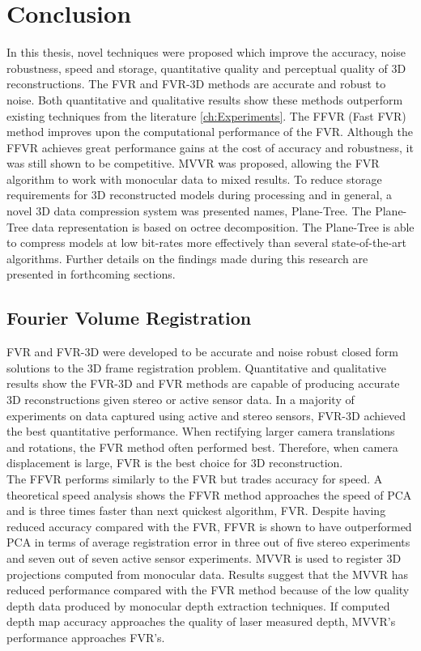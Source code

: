 \makeatletter
\chapter{Conclusion}
\label{ch:Conclusion}

In this thesis, novel techniques were proposed which improve the accuracy, noise robustness, speed and storage, quantitative quality and perceptual quality of 3D reconstructions. The FVR and FVR-3D methods are accurate and robust to noise. Both quantitative and qualitative results show these methods outperform existing techniques from the literature \ref{ch:Experiments}. The FFVR (Fast FVR) method improves upon the computational performance of the FVR. Although the FFVR achieves great performance gains at the cost of accuracy and robustness, it was still shown to be competitive. MVVR was proposed, allowing the FVR algorithm to work with monocular data to mixed results. To reduce storage requirements for 3D reconstructed models during processing and in general, a novel 3D data compression system was presented names, Plane-Tree. The Plane-Tree data representation is based on octree decomposition. The Plane-Tree is able to compress models at low bit-rates more effectively than several state-of-the-art algorithms. Further details on the findings made during this research are presented in forthcoming sections. \\

\section{Fourier Volume Registration}
\label{Sec:ConcFVR}

FVR and FVR-3D were developed to be accurate and noise robust closed form solutions to the 3D frame registration problem. Quantitative and qualitative results show the FVR-3D and FVR methods are capable of producing accurate 3D reconstructions given stereo or active sensor data. In a majority of experiments on data captured using active and stereo sensors, FVR-3D achieved the best quantitative performance.  When rectifying larger camera translations and rotations, the FVR method often performed best. Therefore, when camera displacement is large, FVR is the best choice for 3D reconstruction. \\

The FFVR performs similarly to the FVR but trades accuracy for speed. A theoretical speed analysis shows the FFVR method approaches the speed of PCA and is three times faster than next quickest algorithm, FVR. Despite having reduced accuracy compared with the FVR, FFVR is shown to have outperformed PCA in terms of average registration error in three out of five stereo experiments and seven out of seven active sensor experiments. MVVR is used to register 3D projections computed from monocular data. Results suggest that the MVVR has reduced performance compared with the FVR method because of the low quality depth data produced by monocular depth extraction techniques. If computed depth map accuracy approaches the quality of laser measured depth, MVVR's performance approaches FVR's. \\


